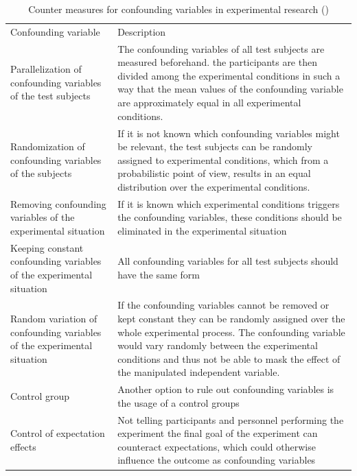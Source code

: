 \begin{table}[htbp]
    \centering
    \begin{tabular}{|L{0.49\textwidth}|L{0.49\textwidth}|}
    Confounding variable                                          & Description \\ 
    Parallelization of confounding variables of the test subjects & The confounding variables of all test subjects are measured beforehand. the participants are then divided among the experimental conditions in such a way that the mean values of the confounding variable are approximately equal in all experimental conditions.         \\ 
    Randomization of confounding variables of the subjects        & If it is not known which confounding variables might be relevant, the test subjects can be randomly assigned to experimental conditions, which from a probabilistic point of view, results in an equal distribution over the experimental conditions.     \\ 
    Removing confounding variables of the experimental situation      & If it is known which experimental conditions triggers the confounding variables, these conditions should be eliminated in the experimental situation            \\ 
    Keeping constant confounding variables of the experimental situation  & All confounding variables for all test subjects should have the same form         \\ 
    Random variation of confounding variables of the experimental situation & If the confounding variables cannot be removed or kept constant they can be randomly assigned over the whole experimental process. The confounding variable would vary randomly between the experimental conditions and thus not be able to mask the effect of the manipulated independent variable.     \\ 
    Control group                    &  Another option to rule out confounding variables is the usage of a control groups           \\ 
    Control of expectation effects                   &  Not telling participants and personnel performing the experiment the final goal of the experiment can counteract expectations, which could otherwise influence the outcome as confounding variables           \\ 
    \end{tabular}
    \caption[Counter measures for confounding variables]{Counter measures for confounding variables in experimental research (\cite{Gniewosz.2011})}
    \label{tab:confounding_variables}
    \end{table}

